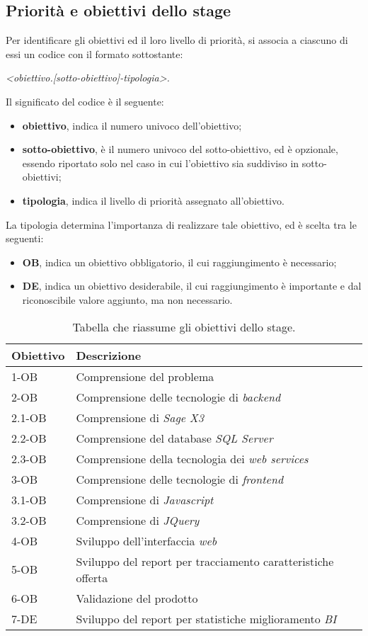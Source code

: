 \subsection{Priorità e obiettivi dello stage}
Per identificare gli obiettivi ed il loro livello di priorità, si associa a ciascuno di essi un codice con il formato sottostante:
\\
\begin{center}
	\textit{<obiettivo.[sotto-obiettivo]-tipologia>. }
\end{center}
Il significato del codice è il seguente:
\begin{itemize}
\item \textbf{obiettivo}, indica il numero univoco dell'obiettivo;
\item \textbf{sotto-obiettivo}, è il numero univoco del sotto-obiettivo, ed è opzionale, essendo riportato solo nel caso in cui l'obiettivo sia suddiviso in sotto-obiettivi;
\item \textbf{tipologia}, indica il livello di priorità assegnato all'obiettivo.
\end{itemize}
La tipologia determina l'importanza di realizzare tale obiettivo, ed è scelta tra le seguenti:
\begin{itemize}
	\item \textbf{OB}, indica un obiettivo obbligatorio, il cui raggiungimento è necessario;
	\item \textbf{DE}, indica un obiettivo desiderabile, il cui raggiungimento è importante e dal riconoscibile valore aggiunto, ma non necessario.
\end{itemize}

\begin{table}
\caption{Tabella che riassume gli obiettivi dello stage.}
\label{tab:requisiti-stage}
\begin{tabularx}{\textwidth}{lXl}
\hline\hline
\textbf{Obiettivo} & \textbf{Descrizione}\\
\hline
1-OB & Comprensione del problema\\
\hline
2-OB & Comprensione delle tecnologie di \textit{backend}\\
\hline
2.1-OB & Comprensione di \textit{Sage X3}\\
\hline
2.2-OB & Comprensione del database \textit{SQL Server}\\
\hline
2.3-OB & Comprensione della tecnologia dei \textit{web services}\\
\hline
3-OB & Comprensione delle tecnologie di \textit{frontend}\\
\hline
3.1-OB & Comprensione di \textit{Javascript}\\
\hline
3.2-OB & Comprensione di \textit{JQuery}\\
\hline
4-OB & Sviluppo dell'interfaccia \textit{web}\\
\hline
5-OB & Sviluppo del report per tracciamento caratteristiche offerta
\\
\hline
6-OB & Validazione del prodotto\\
\hline
7-DE & Sviluppo del report per statistiche miglioramento \textit{BI}\\
\hline
\end{tabularx}
\end{table}

